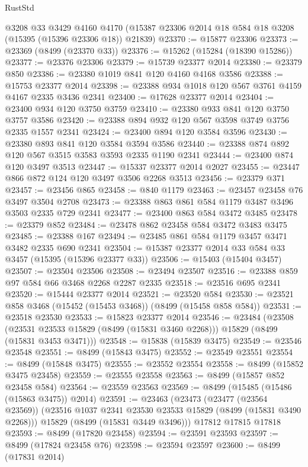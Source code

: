 \begin{lexlean}{RustStd}
\begin{coremodule}
    @3208
    @33
    @3429
    @4160
    @4170
    (@15387 @23306 @2014 @18 @584 @18 @3208 (@15395 (@15396 @23306 @18)) @21839)
@23370 := @15877 @23306
@23373 := @23369 (@8499 (@23370 @33))
@23376 := @15262 (@15284 (@18390 @15286))
@23377 := @23376 @23306
@23379 := @15739 @23377 @2014
@23380 := @23379 @850
@23386 := @23380 @1019 @841 @120 @4160 @4168 @3586
@23388 := @15753 @23377 @2014
@23398 := @23388 @934 @1018 @120 @567 @3761 @4159 @4167 @2335 @3436 @2341
@23400 := @17628 @23377 @2014
@23404 := @23400 @934 @120 @3750 @3759
@23410 := @23380 @933 @841 @120 @3750 @3757 @3586
@23420 := @23388 @894 @932 @120 @567 @3598 @3749 @3756 @2335 @1557 @2341
@23424 := @23400 @894 @120 @3584 @3596
@23430 := @23380 @893 @841 @120 @3584 @3594 @3586
@23440 := @23388 @874 @892 @120 @567 @3515 @3583 @3593 @2335 @1190 @2341
@23444 := @23400 @874 @120 @3497 @3513
@23447 := @15337 @23377 @2014 @2027
@23455 := @23447 @866 @872 @124 @120 @3497 @3506 @2268 @3513
@23456 := @23379 @371
@23457 := @23456 @865
@23458 := @840 @1179
@23463 := @23457 @23458 @76 @3497 @3504 @2708
@23473 := @23388 @863 @861 @584 @1179 @3487 @3496 @3503 @2335 @729 @2341
@23477 := @23400 @863 @584 @3472 @3485
@23478 := @23379 @852
@23484 := @23478 @862 @23458 @584 @3472 @3483 @3475
@23485 := @23388 @167
@23494 := @23485 @861 @584 @1179 @3457 @3471 @3482 @2335 @690 @2341
@23504 := @15387 @23377 @2014 @33 @584 @33 @3457 (@15395 (@15396 @23377 @33))
@23506 := @15403 (@15404 @3457)
@23507 := @23504 @23506
@23508 := @23494 @23507
@23516 := @23388 @859 @97 @584 @66 @3468 @2268 @2287 @2335
@23518 := @23516 @695 @2341
@23520 := @15444 @23377 @2014
@23521 := @23520 @584
@23530 := @23521 @858 @3468 (@15452 (@15453 @3468)) (@8499 (@15458 @858 @584))
@23531 := @23518 @23530
@23533 := @15823 @23377 @2014
@23546 := @23484
    (@23508 (@23531 @23533 @15829 (@8499 (@15831 @3460 @2268))) @15829 (@8499 (@15831 @3453 @3471)))
@23548 := @15838 (@15839 @3475)
@23549 := @23546 @23548
@23551 := @8499 (@15843 @3475)
@23552 := @23549 @23551
@23554 := @8499 (@15848 @3475)
@23555 := @23552 @23554
@23558 := @8499 (@15852 @3475 @23458)
@23559 := @23555 @23558
@23563 := @8499 (@15857 @852 @23458 @584)
@23564 := @23559 @23563
@23569 := @8499 (@15485 (@15486 (@15863 @3475)) @2014)
@23591 := @23463
    (@23473
      (@23477 (@23564 @23569))
      (@23516 @1037 @2341 @23530 @23533 @15829 (@8499 (@15831 @3490 @2268)))
      @15829
      (@8499 (@15831 @3449 @3496)))
    @17812
    @17815
    @17818
@23593 := @8499 (@17820 @23458)
@23594 := @23591 @23593
@23597 := @8499 (@17824 @23458 @76)
@23598 := @23594 @23597
@23600 := @8499 (@17831 @2014)

\end{coremodule}
\end{lexlean}
